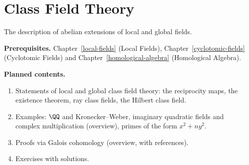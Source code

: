\chapter{Class Field Theory}\label{class-field-theory}

The description of abelian extensions of local and global fields.

\noindent\textbf{Prerequisites.} Chapter~\ref{local-fields} (Local Fields), Chapter~\ref{cyclotomic-fields} (Cyclotomic Fields) and Chapter~\ref{homological-algebra} (Homological Algebra).

\noindent\textbf{Planned contents.}
\begin{enumerate}
\item Statements of local and global class field theory: the reciprocity maps, the existence theorem, ray class fields, the Hilbert class field.
\item Examples: $\QQ$ and Kronecker--Weber, imaginary quadratic fields and complex multiplication (overview), primes of the form $x^2 + ny^2$.
\item Proofs via Galois cohomology (overview, with references).
\item Exercises with solutions.
\end{enumerate}
